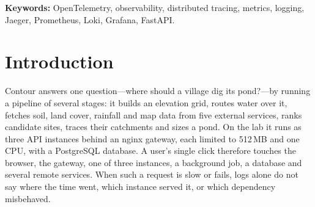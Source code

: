 \documentclass[11pt,a4paper]{article}
\begin{document}
\begin{abstract}
This report describes how OpenTelemetry was added to \emph{Contour}, the village pond planning
system built for Assignment~1, and what the collected data showed. The FastAPI backend exports
all three signals---traces, metrics and logs---over OTLP to an OpenTelemetry Collector, which
stores them in Jaeger, Prometheus and Loki, all viewed in Grafana. Automatic instrumentation
covers HTTP requests, outgoing provider calls, SQL statements and thread hand-offs. Manual spans
and metrics cover what is specific to Contour: the analysis job, its wait for an analysis slot,
each pipeline stage, each enrichment layer, each rainfall source and each terrain tile read. The
React front end is traced too, so a single trace runs from the click on \emph{Run} in the
browser, through the nginx gateway, to the API instance, its database queries and its calls to
external data services. The system was run as the same three-instance, 512\,MB-per-instance
layout as the lab deployment, under scripted traffic, errors, an overload burst and a failover.
A verification script read every signal back from its store (11 of 11 checks passed), and 39 new
automated tests assert the instrumentation's behaviour. The telemetry exposed four real problems,
three of which were fixed: request spans that wrongly included background jobs, contour uploads
whose start took 6.1\,s instead of 84\,ms, and a gateway that sent drawn areas to the wrong
instance after a container restart. The fourth, a 40\,s OpenStreetMap service, is outside the
project and is now measured. Instrumentation costs about 10\,MB of memory and 3\,\% of a warm
analysis's time.
\end{abstract}

\noindent\textbf{Keywords:} OpenTelemetry, observability, distributed tracing, metrics, logging,
Jaeger, Prometheus, Loki, Grafana, FastAPI.

\section{Introduction}
\label{sec:intro}
Contour answers one question---where should a village dig its pond?---by running a pipeline of
several stages: it builds an elevation grid, routes water over it, fetches soil, land cover,
rainfall and map data from five external services, ranks candidate sites, traces their catchments
and sizes a pond. On the lab it runs as three API instances behind an nginx gateway, each limited
to 512\,MB and one CPU, with a PostgreSQL database. A user's single click therefore touches the
browser, the gateway, one of three instances, a background job, a database and several remote
services. When such a request is slow or fails, logs alone do not say where the time went, which
instance served it, or which dependency misbehaved.
\end{document}
